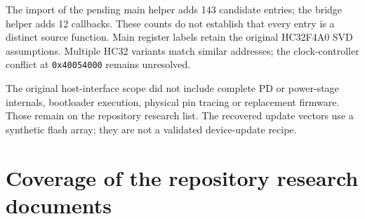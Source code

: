The import of the pending main helper adds 143 candidate entries; the
bridge helper adds 12 callbacks. These counts do not establish that
every entry is a distinct source function. Main register labels retain
the original HC32F4A0 SVD assumptions. Multiple HC32 variants match
similar addresses; the clock-controller conflict at \texttt{0x40054000}
remains unresolved.

The original host-interface scope did not include complete PD or
power-stage internals, bootloader execution, physical pin tracing or
replacement firmware. Those remain on the repository research list. The
recovered update vectors use a synthetic flash array; they are not a
validated device-update recipe.

\section{Coverage of the repository research
documents}\label{coverage-of-the-repository-research-documents}

